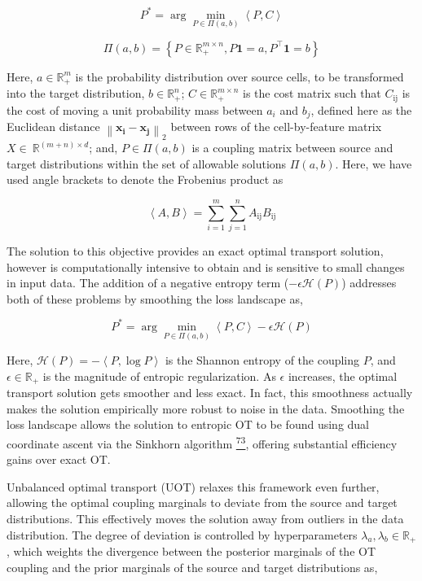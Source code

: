 \[P^{*} = \mathrm{\arg}\underset{P \in \Pi(a,b)}{\mathrm{\min}}\left\langle P,C \right\rangle\]

\[\Pi(a,b) = \left\{ P \in \mathbb{R}_{+}^{m \times n},P\mathbf{1} = a,P^{\top}\mathbf{1} = b \right\}\]

Here, \(a \in \mathbb{R}_{+}^{m}\) is the probability distribution over
source cells, to be transformed into the target distribution,
\(b \in \mathbb{R}_{+}^{n}\); \(C \in \mathbb{R}_{+}^{m \times n}\) is
the cost matrix such that \(C_{\text{ij}}\) is the cost of moving a unit
probability mass between \(a_{i}\) and \(b_{j}\), defined here as the
Euclidean distance
\(\left\| \mathbf{x}_{\mathbf{i}} - \mathbf{x}_{\mathbf{j}} \right\|_{2}\)
between rows of the cell-by-feature matrix
\(X \in \ \mathbb{R}^{\left( m + n \right) \times d}\); and,
\(P \in \Pi(a,b)\) is a coupling matrix between source and target
distributions within the set of allowable solutions \(\Pi(a,b)\). Here,
we have used angle brackets to denote the Frobenius product as

\[\left\langle A,B \right\rangle = \sum_{i = 1}^{m}{\sum_{j = 1}^{n}A_{\text{ij}}}B_{\text{ij}}\]

The solution to this objective provides an exact optimal transport
solution, however is computationally intensive to obtain and is
sensitive to small changes in input data. The addition of a negative
entropy term (\(- \epsilon\mathcal{H}(P)\)) addresses both of these
problems by smoothing the loss landscape as,

\[P^{*} = \mathrm{\arg}\underset{P \in \Pi(a,b)}{\mathrm{\min}}\left\langle P,C \right\rangle - \epsilon\mathcal{H}(P)\]

Here, \(\mathcal{H}(P) = - \left\langle P,\mathrm{\log}P \right\rangle\)
is the Shannon entropy of the coupling \(P\), and
\(\epsilon \in \mathbb{R}_{+}\) is the magnitude of entropic
regularization. As \(\epsilon\) increases, the optimal transport
solution gets smoother and less exact. In fact, this smoothness actually
makes the solution empirically more robust to noise in the data.
Smoothing the loss landscape allows the solution to entropic OT to be
found using dual coordinate ascent via the Sinkhorn algorithm
\href{https://sciwheel.com/work/citation?ids=18541642\&pre=\&suf=\&sa=0\&dbf=0}{\textsuperscript{73}},
offering substantial efficiency gains over exact OT.

Unbalanced optimal transport (UOT) relaxes this framework even further,
allowing the optimal coupling marginals to deviate from the source and
target distributions. This effectively moves the solution away from
outliers in the data distribution. The degree of deviation is controlled
by hyperparameters \(\lambda_{a},\lambda_{b} \in \mathbb{R}_{+}\), which
weights the divergence between the posterior marginals of the OT
coupling and the prior marginals of the source and target distributions
as,

